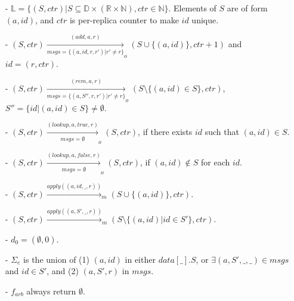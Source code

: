 {\color {red}
\begin{itemize}
\setlength{\itemsep}{0.5pt}
\item[-] $\mathbb{L} = \{ (S,\mathit{ctr}) \vert S \subseteq \mathbb{D} \times (\mathbb{R} \times \mathbb{N}), \mathit{ctr} \in \mathbb{N} \}$. Elements of $S$ are of form $(a,id)$, and $\mathit{ctr}$ is per-replica counter to make $id$ unique.

\item[-] $(S,\mathit{ctr}) \xrightarrow[\mathit{msgs} = \{ (a,\mathit{id},r,r') \vert r' \neq r \}]{(\mathit{add},a,r)}_o (S \cup \{ (a,\mathit{id}) \}, \mathit{ctr}+1)$ and $\mathit{id} = (r,\mathit{ctr})$.

\item[-] $(S,\mathit{ctr}) \xrightarrow[\mathit{msgs} = \{ (a,S'',r,r') \vert r' \neq r \} ]{(\mathit{rem},a,r)}_o (S \setminus \{ (a,id) \in S \}, \mathit{ctr})$, $S'' = \{ id \vert (a,id) \in S \} \neq \emptyset$.

\item[-] $(S,\mathit{ctr}) \xrightarrow[\mathit{msgs} = \emptyset]{(\mathit{lookup},a,\mathit{true},r)}_o (S, \mathit{ctr})$, if there exists $\mathit{id}$ such that $(a,\mathit{id}) \in S$.

\item[-] $(S,\mathit{ctr}) \xrightarrow[\mathit{msgs} = \emptyset]{(\mathit{lookup},a,\mathit{false},r)}_o (S, \mathit{ctr})$, if $(a,\mathit{id}) \notin S$ for each $\mathit{id}$.

\item[-] $(S,\mathit{ctr}) \xrightarrow{\mathit{apply}((a,id,\_,r))}_m (S \cup \{ (a,id) \}, \mathit{ctr})$.

\item[-] $(S,\mathit{ctr}) \xrightarrow{\mathit{apply}((a,S',\_,r))}_m (S \setminus \{ (a,id) \vert id \in S' \}, \mathit{ctr})$.

\item[-] $d_0 = (\emptyset,0)$.

\item[-] $\Sigma_e$ is the union of (1) $(a,id)$ in either $\mathit{data}[\_].S$, or $\exists (a,S',\_,\_) \in \mathit{msgs}$ and $id \in S'$, and (2) $(a,S',r)$ in $\mathit{msgs}$.

\item[-] $f_{\mathit{arb}}$ always return $\emptyset$.
\end{itemize}
}



